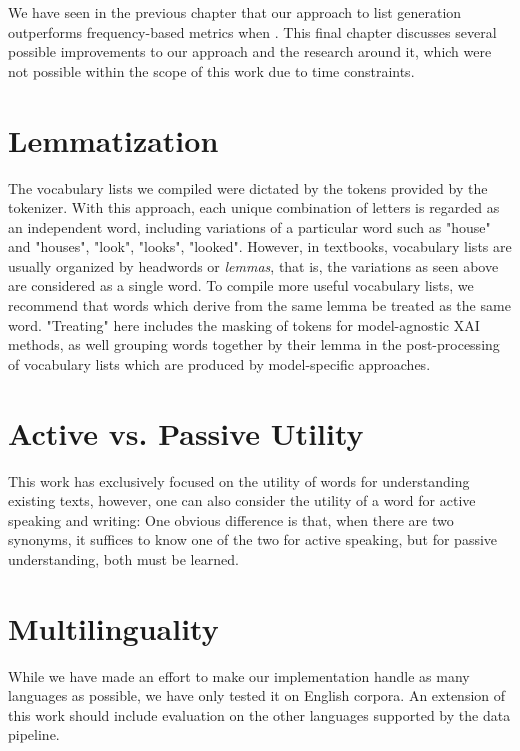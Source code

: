 %
We have seen in the previous chapter that our approach to list generation outperforms frequency-based metrics when .
This final chapter discusses several possible improvements to our approach and the research around it, which were not possible within the scope of this work due to time constraints.

\section{Lemmatization}
The vocabulary lists we compiled were dictated by the tokens provided by the tokenizer.
With this approach, each unique combination of letters is regarded as an independent word, including variations of a particular word such as "house" and "houses", "look", "looks", "looked".
However, in textbooks, vocabulary lists are usually organized by headwords or \textit{lemmas}, that is, the variations as seen above are considered as a single word.
To compile more useful vocabulary lists, we recommend that words which derive from the same lemma be treated as the same word.
"Treating" here includes the masking of tokens for model-agnostic XAI methods, as well grouping words together by their lemma in the post-processing of vocabulary lists which are produced by model-specific approaches.

\section{Active vs. Passive Utility}
This work has exclusively focused on the utility of words for understanding existing texts, however, one can also consider the utility of a word for active speaking and writing:
One obvious difference is that, when there are two synonyms, it suffices to know one of the two for active speaking, but for passive understanding, both must be learned.

\section{Multilinguality}
While we have made an effort to make our implementation handle as many languages as possible, we have only tested it on English corpora.
An extension of this work should include evaluation on the other languages supported by the data pipeline.

